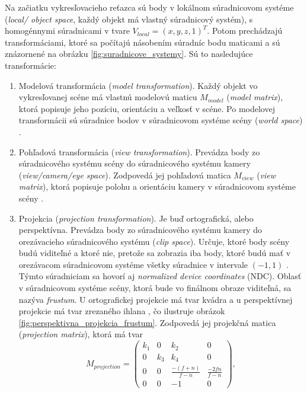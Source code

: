 Na začiatku vykresľovacieho reťazca sú body v lokálnom súradnicovom systéme (\emph{\mbox{local}/ object space}, každý objekt má vlastný súradnicový systém), s homogénnymi súradnicami v tvare $V_{local} = (x, y, z, 1)^T$. Potom prechádzajú transformáciami, ktoré sa počítajú násobením súradníc bodu maticami a sú znázornené na obrázku \ref{fig:suradnicove_systemy}. Sú to nasledujúce transformácie:

\begin{enumerate}
    \item Modelová transformácia (\emph{model transformation}). Každý objekt vo vykresľovanej scéne má vlastnú modelovú maticu $M_{model}$ (\emph{model matrix}), ktorá popisuje jeho pozíciu, orientáciu a veľkosť v scéne. Po modelovej transformácii sú súradnice bodov v súradnicovom systéme scény (\emph{world space}) \cite{de_vries_coordinate_systems, stemkoski_graphics}.
    \item Pohľadová transformácia (\emph{view transformation}). Prevádza body zo súradnicového systému scény do súradnicového systému kamery (\emph{view/camera/eye space}). Zodpovedá jej pohľadová matica $M_{view}$ (\emph{view matrix}), ktorá popisuje polohu a orientáciu kamery v súradnicovom systéme scény \cite{de_vries_coordinate_systems, stemkoski_graphics}. 
    \item Projekcia (\emph{projection transformation}). Je buď ortografická, alebo perspektívna. Prevádza body zo súradnicového systému kamery do orezávacieho súradnicového systému (\emph{clip space}). Určuje, ktoré body scény budú viditeľné a ktoré nie, pretože sa zobrazia iba body, ktoré budú mať v orezávacom súradnicovom systéme všetky súradnice v intervale $(-1, 1)$ \cite{stemkoski_graphics}. Týmto súradniciam sa hovorí aj \emph{normalized device coordinates} (NDC). Oblasť v súradnicovom systéme scény, ktorá bude vo finálnom obraze viditeľná, sa nazýva \emph{frustum}. U ortografickej projekcie má tvar kvádra a u perspektívnej projekcie má tvar zrezaného ihlana \cite{de_vries_coordinate_systems}, čo ilustruje obrázok \ref{fig:perspektivna_projekcia_frustum}. Zodpovedá jej projekčná matica (\emph{projection matrix}), ktorá má tvar 
    $$
    M_{projection} = 
    \begin{pmatrix}
    k_1 & 0 & k_2 & 0 \\
    0 & k_3 & k_4 & 0 \\
    0 & 0 & \frac{-(f+n)}{f-n} & \frac{-2fn}{f-n} \\
    0 & 0 & -1 & 0
    \end{pmatrix}
    \mathrm{,}
$$
\end{enumerate}
